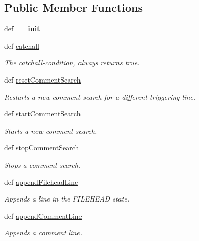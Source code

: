\subsection*{Public Member Functions}
\begin{DoxyCompactItemize}
\item 
\hypertarget{classmitgcm_1_1doxypy_1_1Doxypy_a6cb46b49f5cd81db7ae50771f17c4551}{def {\bfseries \+\_\+\+\_\+init\+\_\+\+\_\+}}\label{classmitgcm_1_1doxypy_1_1Doxypy_a6cb46b49f5cd81db7ae50771f17c4551}

\item 
def \hyperlink{classmitgcm_1_1doxypy_1_1Doxypy_a4028ae27b773bb7f8e66c5e7bcd3c0f3}{catchall}
\begin{DoxyCompactList}\small\item\em The catchall-\/condition, always returns true. \end{DoxyCompactList}\item 
def \hyperlink{classmitgcm_1_1doxypy_1_1Doxypy_aa6dcb30ac72003369eecbd38aec866d7}{reset\+Comment\+Search}
\begin{DoxyCompactList}\small\item\em Restarts a new comment search for a different triggering line. \end{DoxyCompactList}\item 
def \hyperlink{classmitgcm_1_1doxypy_1_1Doxypy_a8c81f3e810eb8c2cf83b06b9801dc316}{start\+Comment\+Search}
\begin{DoxyCompactList}\small\item\em Starts a new comment search. \end{DoxyCompactList}\item 
def \hyperlink{classmitgcm_1_1doxypy_1_1Doxypy_aca92c3c3b02c7fd2c51ccd6b462a2687}{stop\+Comment\+Search}
\begin{DoxyCompactList}\small\item\em Stops a comment search. \end{DoxyCompactList}\item 
def \hyperlink{classmitgcm_1_1doxypy_1_1Doxypy_a950e0443aea8b6960c4326de48ea1d3a}{append\+Filehead\+Line}
\begin{DoxyCompactList}\small\item\em Appends a line in the F\+I\+L\+E\+H\+E\+A\+D state. \end{DoxyCompactList}\item 
def \hyperlink{classmitgcm_1_1doxypy_1_1Doxypy_a8fa7e07a1206e8ff87e9e8660c9ca3d7}{append\+Comment\+Line}
\begin{DoxyCompactList}\small\item\em Appends a comment line. \end{DoxyCompactList}\item 

\end{DoxyCompactItemize}

